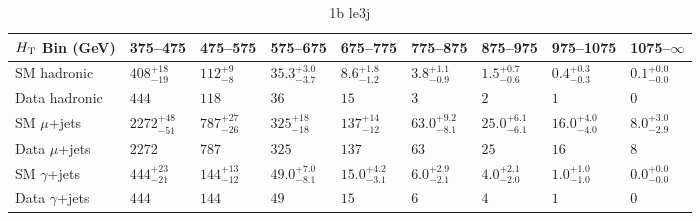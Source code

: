 \documentclass[8pt]{article}
\def\scalht{\mbox{$H_{\rm{T}}$}\xspace}
\newcommand\T{\rule{0pt}{2.6ex}}
\newcommand\B{\rule[-1.2ex]{0pt}{0pt}}
\begin{document}
\begin{table}[ht!]
\caption{1b le3j}
\label{tab:ensemble-1b le3j}
\centering
\begin{tabular}{ lllllllll }

\hline
\scalht Bin (GeV)       & 375--475                       & 475--575                       & 575--675                       & 675--775                       & 775--875                       & 875--975                       & 975--1075                      & 1075--$\infty$                 \\ [1.000000ex]
\hline
SM hadronic\T           & $408^{+18}_{-19}$              & $112^{+9}_{-8}$                & $35.3^{+3.0}_{-3.7}$           & $8.6^{+1.8}_{-1.2}$            & $3.8^{+1.1}_{-0.9}$            & $1.5^{+0.7}_{-0.6}$            & $0.4^{+0.3}_{-0.3}$            & $0.1^{+0.0}_{-0.0}$            \\ 
Data hadronic\B         & $444$                          & $118$                          & $36$                           & $15$                           & $3$                            & $2$                            & $1$                            & $0$                            \\ 
\hline
SM $\mu$+jets\T         & $2272^{+48}_{-51}$             & $787^{+27}_{-26}$              & $325^{+18}_{-18}$              & $137^{+14}_{-12}$              & $63.0^{+9.2}_{-8.1}$           & $25.0^{+6.1}_{-6.1}$           & $16.0^{+4.0}_{-4.0}$           & $8.0^{+3.0}_{-2.9}$            \\ 
Data $\mu$+jets\B       & $2272$                         & $787$                          & $325$                          & $137$                          & $63$                           & $25$                           & $16$                           & $8$                            \\ 
\hline
SM $\gamma$+jets\T      & $444^{+23}_{-21}$              & $144^{+13}_{-12}$              & $49.0^{+7.0}_{-8.1}$           & $15.0^{+4.2}_{-3.1}$           & $6.0^{+2.9}_{-2.1}$            & $4.0^{+2.1}_{-2.0}$            & $1.0^{+1.0}_{-1.0}$            & $0.0^{+0.0}_{-0.0}$            \\ 
Data $\gamma$+jets\B    & $444$                          & $144$                          & $49$                           & $15$                           & $6$                            & $4$                            & $1$                            & $0$                            \\ 
\hline

\end{tabular}
\end{table}
\end{document}
